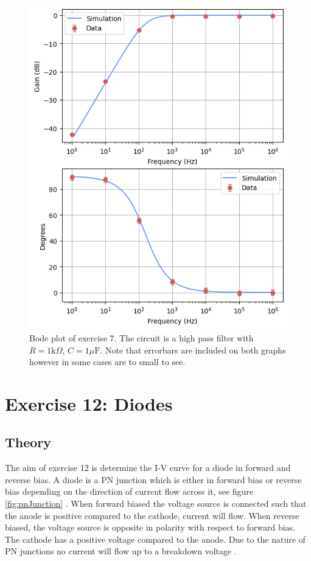 \documentclass[%
reprint,
amsmath,amssymb,
aps,
floatfix
]{revtex4-2}
\begin{document}
		\begin{figure}
			\includegraphics[width=0.85\columnwidth]{ex7_dualPlot.png}
			\caption{\label{fig:ex7Results}Bode plot of exercise 7. The circuit is a high pass filter with $R = 1 \text{k}\Omega$, $C = 1 \mu\text{F}$. Note that errorbars are included on both graphs however in some cases are to small to see.}
		\end{figure}
		
	\section{Exercise 12: Diodes}
		\subsection{Theory}
		The aim of exercise 12 is determine the I-V curve for a diode in forward and reverse bias. A diode is a PN junction which is either in forward bias or reverse bias depending on the direction of current flow across it, see figure \ref{fig:pnJunction} \cite{manual}. When forward biased the voltage source is connected such that the anode is positive compared to the cathode, current will flow. When reverse biased, the voltage source is opposite in polarity with respect to forward bias. The cathode has a positive voltage compared to the anode. Due to the nature of PN junctions no current will flow up to a breakdown voltage \cite{manual}.
		
\end{document}
